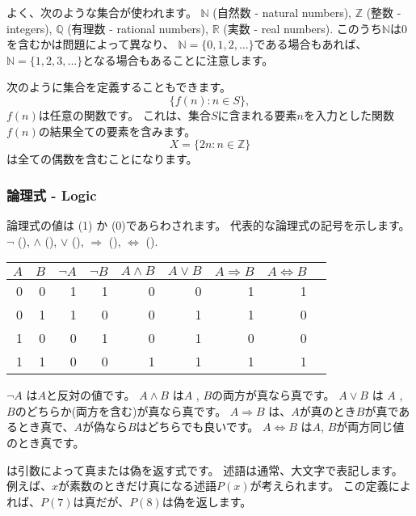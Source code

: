 よく、次のような集合が使われます。
$\mathbb{N}$ (自然数 - natural numbers),
$\mathbb{Z}$ (整数 - integers),
$\mathbb{Q}$ (有理数 - rational numbers), 
$\mathbb{R}$ (実数 - real numbers).
このうち$\mathbb{N}$は0を含むかは問題によって異なり、
$\mathbb{N}=\{0,1,2,\ldots\}$である場合もあれば、
$\mathbb{N}=\{1,2,3,...\}$となる場合もあることに注意します。

次のように集合を定義することもできます。
\[\{f(n) : n \in S\},\]
$f(n)$は任意の関数です。
これは、集合$S$に含まれる要素$n$を入力とした関数$f(n)$の結果全ての要素を含みます。
\[X=\{2n : n \in \mathbb{Z}\}\]
は全ての偶数を含むことになります。


\subsubsection{論理式 - Logic}


論理式の値は
 (1) か  (0)であらわされます。
代表的な論理式の記号を示します。
$\lnot$ (),
$\land$ (),
$\lor$ (),
$\Rightarrow$ (),
$\Leftrightarrow$ ().

\begin{center}
\begin{tabular}{rr|rrrrrrr}
$A$ & $B$ & $\lnot A$ & $\lnot B$ & $A \land B$ & $A \lor B$ & $A \Rightarrow B$ & $A \Leftrightarrow B$ \\
\hline
0 & 0 & 1 & 1 & 0 & 0 & 1 & 1 \\
0 & 1 & 1 & 0 & 0 & 1 & 1 & 0 \\
1 & 0 & 0 & 1 & 0 & 1 & 0 & 0 \\
1 & 1 & 0 & 0 & 1 & 1 & 1 & 1 \\
\end{tabular}
\end{center}

$\lnot A$ は$A$と反対の値です。
$A \land B$ は$A$ ,  $B$の両方が真なら真です。
$A \lor B$ は $A$ ,  $B$のどちらか(両方を含む)が真なら真です。
$A \Rightarrow B$ は、$A$が真のとき$B$が真であるとき真で、$A$が偽なら$B$はどちらでも良いです。
$A \Leftrightarrow B$ は$A$, $B$が両方同じ値のとき真です。


は引数によって真または偽を返す式です。
述語は通常、大文字で表記します。
例えば、$x$が素数のときだけ真になる述語$P(x)$が考えられます。
この定義によれば、$P(7)$は真だが、$P(8)$は偽を返します。

